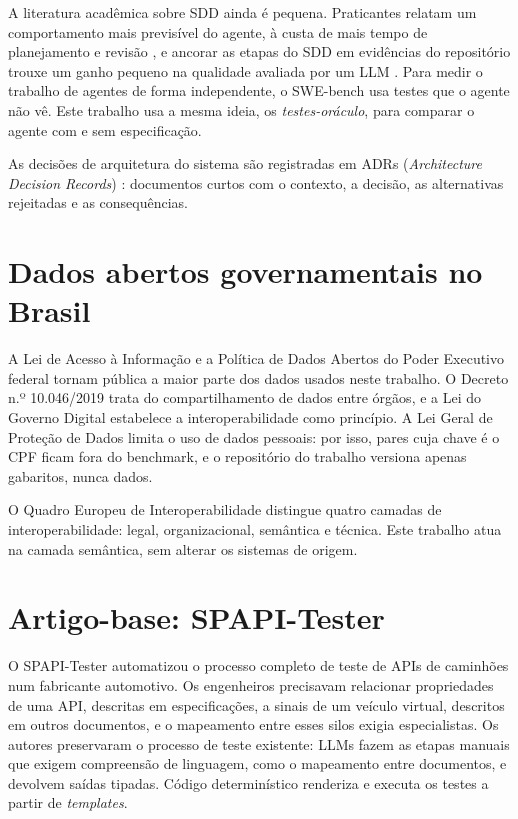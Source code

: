 A literatura acadêmica sobre SDD ainda é pequena. Praticantes relatam um
comportamento mais previsível do agente, à custa de mais tempo de
planejamento e revisão \cite{agarwal2026sdd}, e ancorar as etapas do SDD em
evidências do repositório trouxe um ganho pequeno na qualidade avaliada por
um LLM \cite{taghavi2026speckitagents}. Para medir o trabalho de agentes de
forma independente, o SWE-bench \cite{jimenez2024swebench} usa testes que o
agente não vê. Este trabalho usa a mesma ideia, os \emph{testes-oráculo},
para comparar o agente com e sem especificação.

As decisões de arquitetura do sistema são registradas em ADRs
(\emph{Architecture Decision Records}) \cite{nygard2011adr}: documentos curtos
com o contexto, a decisão, as alternativas rejeitadas e as consequências.

\section{Dados abertos governamentais no Brasil}
\label{sec:fundamentacao-dados-abertos-governamentais-no-brasil}

A Lei de Acesso à Informação \cite{lai2011} e a Política de Dados Abertos do
Poder Executivo federal \cite{decreto8777} tornam pública a maior parte dos
dados usados neste trabalho. O Decreto n.º 10.046/2019 \cite{decreto10046}
trata do compartilhamento de dados entre órgãos, e a Lei do Governo Digital
\cite{lei14129} estabelece a interoperabilidade como princípio. A Lei Geral
de Proteção de Dados \cite{lgpd2018} limita o uso de dados pessoais: por isso,
pares cuja chave é o CPF ficam fora do benchmark, e o repositório do trabalho
versiona apenas gabaritos, nunca dados.

O Quadro Europeu de Interoperabilidade \cite{eif2017} distingue quatro
camadas de interoperabilidade: legal, organizacional, semântica e técnica.
Este trabalho atua na camada semântica, sem alterar os sistemas de origem.

\section{Artigo-base: SPAPI-Tester}
\label{sec:fundamentacao-artigo-base-spapi-tester}

O SPAPI-Tester \cite{wang2025spapi} automatizou o processo completo de teste
de APIs de caminhões num fabricante automotivo. Os engenheiros precisavam
relacionar propriedades de uma API, descritas em especificações, a sinais de
um veículo virtual, descritos em outros documentos, e o mapeamento entre esses
silos exigia especialistas. Os autores preservaram o processo de teste
existente: LLMs fazem as etapas manuais que exigem compreensão de linguagem,
como o mapeamento entre documentos, e devolvem saídas tipadas. Código
determinístico renderiza e executa os testes a partir de \emph{templates}.

